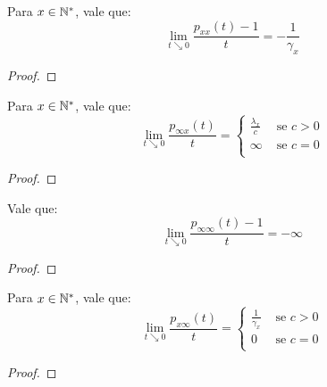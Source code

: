 \begin{proposicao}
  Para $x \in {\mathbb{N^*}}$, vale que:
  \begin{displaymath}
    \lim_{t \searrow 0} \frac{p_{xx}(t) - 1}{t} = -\frac{1}{\gamma_x}
  \end{displaymath}
\end{proposicao}
\begin{proof}
  
\end{proof}

\begin{proposicao}
  Para $x \in {\mathbb{N^*}}$, vale que:
  \begin{displaymath}
    \lim_{t \searrow 0} \frac{p_{\infty x}(t)}{t} = \begin{cases}
      \frac{\lambda_x}{c} & \textrm{ se } c > 0 \\
      \infty & \textrm{ se } c = 0 \\
    \end{cases}
  \end{displaymath}
\end{proposicao}
\begin{proof}
  
\end{proof}

\begin{proposicao}
  Vale que:
  \begin{displaymath}
    \lim_{t \searrow 0} \frac{p_{\infty \infty}(t) - 1}{t} = -\infty
  \end{displaymath}
\end{proposicao}
\begin{proof}
  
\end{proof}

\begin{proposicao}
  Para $x \in {\mathbb{N^*}}$, vale que:
  \begin{displaymath}
    \lim_{t \searrow 0} \frac{p_{x \infty}(t)}{t} = \begin{cases}
      \frac{1}{\gamma_x} & \textrm{ se } c > 0 \\
      0 & \textrm{ se } c = 0 \\
    \end{cases}
  \end{displaymath}
\end{proposicao}
\begin{proof}
  
\end{proof}

